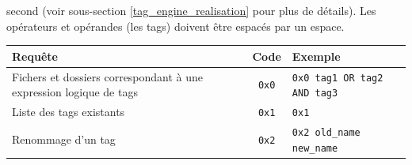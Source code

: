 second (voir sous-section \ref{tag_engine_realisation} pour plus de détails). Les opérateurs et 
opérandes (les tags) doivent être espacés par un espace.
\begin{center}
    \begin{tabular}{|p{6cm}|c|p{6cm}|} \hline
        \textbf{Requête} & \textbf{Code} & \textbf{Exemple} \\ \hline
        Fichers et dossiers correspondant à une expression logique de tags & \texttt{0x0} & 
            \texttt{0x0 tag1 OR tag2 AND tag3} \\ \hline
        Liste des tags existants & \texttt{0x1} & \texttt{0x1} \\ \hline
        Renommage d'un tag & \texttt{0x2} & \texttt{0x2 old_name new_name} \\ \hline
    \end{tabular}
    \label{tag_manager_sockets_protocol}
\end{center}

